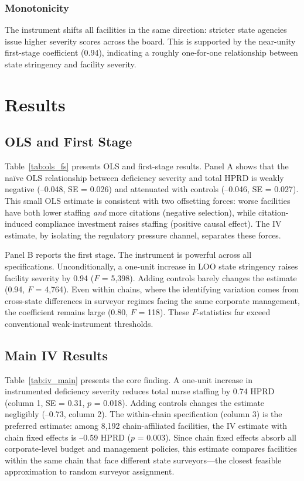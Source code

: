 \documentclass[12pt]{article}
\begin{document}
\subsubsection*{Monotonicity} The instrument shifts all facilities in the same direction: stricter state agencies issue higher severity scores across the board. This is supported by the near-unity first-stage coefficient (0.94), indicating a roughly one-for-one relationship between state stringency and facility severity.

\section{Results}

\subsection{OLS and First Stage}



Table~\ref{tab:ols_fs} presents OLS and first-stage results. Panel A shows that the na\"ive OLS relationship between deficiency severity and total HPRD is weakly negative (--0.048, SE = 0.026) and attenuated with controls (--0.046, SE = 0.027). This small OLS estimate is consistent with two offsetting forces: worse facilities have both lower staffing \textit{and} more citations (negative selection), while citation-induced compliance investment raises staffing (positive causal effect). The IV estimate, by isolating the regulatory pressure channel, separates these forces.

Panel B reports the first stage. The instrument is powerful across all specifications. Unconditionally, a one-unit increase in LOO state stringency raises facility severity by 0.94 ($F$ = 5,398). Adding controls barely changes the estimate (0.94, $F$ = 4,764). Even within chains, where the identifying variation comes from cross-state differences in surveyor regimes facing the same corporate management, the coefficient remains large (0.80, $F$ = 118). These $F$-statistics far exceed conventional weak-instrument thresholds.

\subsection{Main IV Results}



Table~\ref{tab:iv_main} presents the core finding. A one-unit increase in instrumented deficiency severity reduces total nurse staffing by 0.74 HPRD (column 1, SE = 0.31, $p$ = 0.018). Adding controls changes the estimate negligibly (--0.73, column 2). The within-chain specification (column 3) is the preferred estimate: among 8,192 chain-affiliated facilities, the IV estimate with chain fixed effects is --0.59 HPRD ($p$ = 0.003). Since chain fixed effects absorb all corporate-level budget and management policies, this estimate compares facilities within the same chain that face different state surveyors---the closest feasible approximation to random surveyor assignment.
\end{document}

